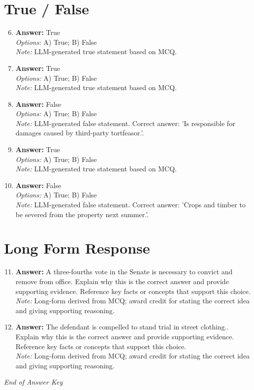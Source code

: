 \documentclass[12pt]{article}
\begin{document}
\section*{True / False}
\begin{enumerate}[label=\arabic*.]
\setcounter{enumi}{5}
\item \textbf{Answer:} True
\\ \textit{Options:} A) True; B) False
\\ \textit{Note:} LLM-generated true statement based on MCQ.
\item \textbf{Answer:} True
\\ \textit{Options:} A) True; B) False
\\ \textit{Note:} LLM-generated true statement based on MCQ.
\item \textbf{Answer:} False
\\ \textit{Options:} A) True; B) False
\\ \textit{Note:} LLM-generated false statement. Correct answer: 'Is responsible for damages caused by third-party tortfeasor.'.
\item \textbf{Answer:} True
\\ \textit{Options:} A) True; B) False
\\ \textit{Note:} LLM-generated true statement based on MCQ.
\item \textbf{Answer:} False
\\ \textit{Options:} A) True; B) False
\\ \textit{Note:} LLM-generated false statement. Correct answer: 'Crops and timber to be severed from the property next summer.'.
\end{enumerate}

\section*{Long Form Response}
\begin{enumerate}[label=\arabic*.]
\setcounter{enumi}{10}
\item \textbf{Answer:} A three-fourths vote in the Senate is necessary to convict and remove from office. Explain why this is the correct answer and provide supporting evidence. Reference key facts or concepts that support this choice.
\\ \textit{Note:} Long-form derived from MCQ; award credit for stating the correct idea and giving supporting reasoning.
\item \textbf{Answer:} The defendant is compelled to stand trial in street clothing.. Explain why this is the correct answer and provide supporting evidence. Reference key facts or concepts that support this choice.
\\ \textit{Note:} Long-form derived from MCQ; award credit for stating the correct idea and giving supporting reasoning.
\end{enumerate}

\vfill
\noindent\textit{End of Answer Key}
\end{document}
